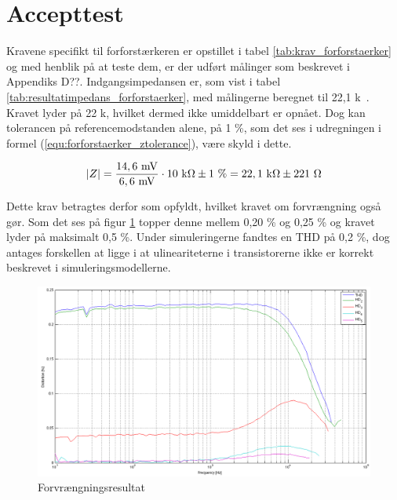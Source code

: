 \section{Accepttest}
\label{forforstaerker_accepttest}

Kravene specifikt til forforstærkeren er opstillet i tabel \ref{tab:krav_forforstaerker} og med henblik på at teste dem, er der udført målinger som beskrevet i Appendiks D??. Indgangsimpedansen er, som vist i tabel \ref{tab:resultatimpedans_forforstaerker}, med målingerne beregnet til 22,1 k\ohm~. Kravet lyder på 22 k\ohm, hvilket dermed ikke umiddelbart er opnået. Dog kan tolerancen på referencemodstanden alene, på 1 \%, som det ses i udregningen i formel (\ref{equ:forforstaerker_ztolerance}), være skyld i dette.

\begin{equation}
\label{equ:forforstaerker_ztolerance}
\vert Z \vert = \frac{\mathrm{14,6~mV}}{\mathrm{6,6~mV}} \cdot \mathrm{10~k\ohm} \pm 1~\% =  \mathrm{22,1~k\ohm} \pm 221~\ohm
\end{equation}

Dette krav betragtes derfor som opfyldt, hvilket kravet om forvrængning også gør. Som det ses på figur \ref{fig:accepttest-thdresultat-forforstaerker} topper denne mellem 0,20 \% og 0,25 \% og kravet lyder på maksimalt 0,5 \%. Under simuleringerne fandtes en THD på 0,2 \%, dog antages forskellen at ligge i at ulineariteterne i transistorerne ikke er korrekt beskrevet i simuleringsmodellerne. 

\begin{figure}[h]
\centering
\includegraphics[width=\textwidth]{maalerapporter/forforstaerker/thd-forforstaerker.png}
\caption{Forvrængningsresultat}
\label{fig:accepttest-thdresultat-forforstaerker}
\end{figure}

